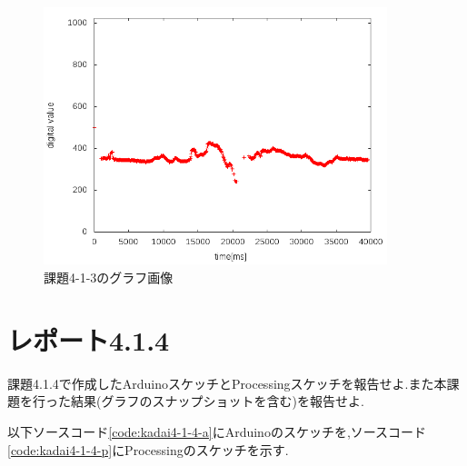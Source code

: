 \documentclass{jarticle}
\begin{document}
\begin{figure}[H]
\begin{center}
\includegraphics[width=10.0cm]{images/kadai4-1-3-graph.png}
\caption{課題4-1-3のグラフ画像}
\label{fig:kadai4-1-2}
\end{center}
\end{figure}

\section{レポート4.1.4}
課題4.1.4で作成したArduinoスケッチとProcessingスケッチを報告せよ.また本課題を行った結果(グラフのスナップショットを含む)を報告せよ.

以下ソースコード\ref{code:kadai4-1-4-a}にArduinoのスケッチを,ソースコード\ref{code:kadai4-1-4-p}にProcessingのスケッチを示す.
\end{document}
